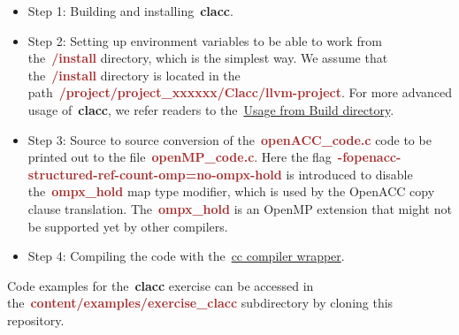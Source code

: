\begin{itemize}
    \item Step 1: Building and installing~\textbf{clacc}.
    
    \item Step 2: Setting up environment variables to be able to work from the~\textbf{\textcolor{brown}{/install}} directory, which is the simplest way. We assume that the~\textbf{\textcolor{brown}{/install}} directory is located in the path~\textbf{\textcolor{brown}{/project/project\_xxxxxx/Clacc/llvm-project}}. For more advanced usage of~\textbf{clacc}, we refer readers to the~\href{https://github.com/llvm-doe-org/llvm-project/blob/clacc/main/README.md}{Usage from Build directory}.
    
    \item Step 3: Source to source conversion of the~\textbf{\textcolor{brown}{openACC\_code.c}} code to be printed out to the file~\textbf{\textcolor{brown}{openMP\_code.c}}. Here the flag~\textbf{\textcolor{brown}{-fopenacc-structured-ref-count-omp=no-ompx-hold}} is introduced to disable the~\textbf{\textcolor{brown}{ompx\_hold}} map type modifier, which is used by the OpenACC copy clause translation. The~\textbf{\textcolor{brown}{ompx\_hold}} is an OpenMP extension that might not be supported yet by other compilers.
    
    \item Step 4: Compiling the code with the~\href{https://docs.lumi-supercomputer.eu/development/compiling/prgenv/}{cc compiler wrapper}.
    
\end{itemize}


\par
Code examples for the~\textbf{clacc} exercise can be accessed in the~\textbf{\textcolor{brown}{content/examples/exercise\_clacc}} subdirectory by cloning this repository.



